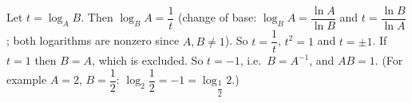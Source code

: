 Let $t=\log_AB$. Then $\log_BA=\dfrac{1}{t}$ (change of base: $\log_BA=\dfrac{\ln A}{\ln B}$ and $t=\dfrac{\ln B}{\ln A}$; both logarithms are nonzero since $A,B\ne1$). So $t=\dfrac{1}{t}$, $t^2=1$ and $t=\pm1$. If $t=1$ then $B=A$, which is excluded. So $t=-1$, i.e.\ $B=A^{-1}$, and $AB=\boxed{1}$. (For example $A=2$, $B=\dfrac{1}{2}$: $\log_2\dfrac{1}{2}=-1=\log_{\dfrac{1}{2}}2$.)
